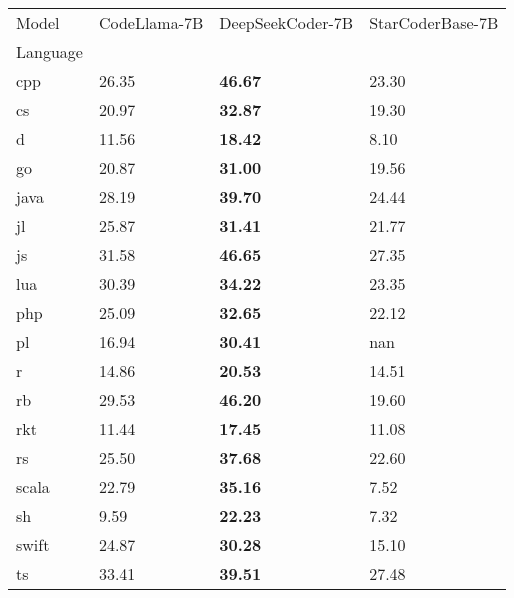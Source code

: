 
\begin{tabular}{llll}
\toprule
Model & CodeLlama-7B & DeepSeekCoder-7B & StarCoderBase-7B \\
Language &  &  &  \\
\midrule
cpp & 26.35 & \textbf{46.67} & 23.30 \\
cs & 20.97 & \textbf{32.87} & 19.30 \\
d & 11.56 & \textbf{18.42} & 8.10 \\
go & 20.87 & \textbf{31.00} & 19.56 \\
java & 28.19 & \textbf{39.70} & 24.44 \\
jl & 25.87 & \textbf{31.41} & 21.77 \\
js & 31.58 & \textbf{46.65} & 27.35 \\
lua & 30.39 & \textbf{34.22} & 23.35 \\
php & 25.09 & \textbf{32.65} & 22.12 \\
pl & 16.94 & \textbf{30.41} & nan \\
r & 14.86 & \textbf{20.53} & 14.51 \\
rb & 29.53 & \textbf{46.20} & 19.60 \\
rkt & 11.44 & \textbf{17.45} & 11.08 \\
rs & 25.50 & \textbf{37.68} & 22.60 \\
scala & 22.79 & \textbf{35.16} & 7.52 \\
sh & 9.59 & \textbf{22.23} & 7.32 \\
swift & 24.87 & \textbf{30.28} & 15.10 \\
ts & 33.41 & \textbf{39.51} & 27.48 \\
\bottomrule
\end{tabular}
